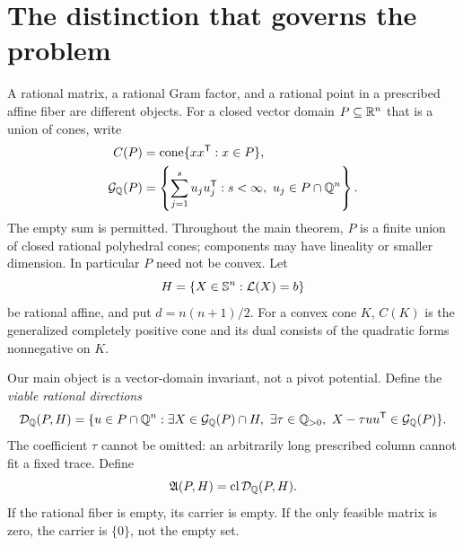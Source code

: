\section{The distinction that governs the problem}
A rational matrix, a rational Gram factor, and a rational point in a prescribed affine fiber are different objects. For a closed vector domain $P\subseteq\mathbb R^n$ that is a union of cones, write
\begin{align}
 C(P)&=\operatorname{cone}\{xx^{\mathsf T}:x\in P\},\\
 \mathcal G_{\mathbb Q}(P)&=\left\{\sum_{j=1}^s u_ju_j^{\mathsf T}:s<\infty,\ u_j\in P\cap\mathbb Q^n\right\}.
\end{align}
The empty sum is permitted. Throughout the main theorem, $P$ is a finite union of closed rational polyhedral cones; components may have lineality or smaller dimension. In particular $P$ need not be convex. Let
\begin{equation}\label{eq:fiber}
 H=\{X\in\mathbb S^n:\mathcal L(X)=b\}
\end{equation}
be rational affine, and put $d=n(n+1)/2$. For a convex cone $K$, $C(K)$ is the generalized completely positive cone and its dual consists of the quadratic forms nonnegative on $K$.

Our main object is a vector-domain invariant, not a pivot potential. Define the \emph{viable rational directions}
\begin{equation}\label{eq:viable}
 \mathcal D_{\Q}(P,H)=\{u\in P\cap\Q^n:\exists X\in\GG(P)\cap H,\ \exists\tau\in\Q_{>0},\ X-\tau uu\trans\in\GG(P)\}.
\end{equation}
The coefficient $\tau$ cannot be omitted: an arbitrarily long prescribed column cannot fit a fixed trace. Define
\begin{equation}\label{eq:carrierdef}
 \mathfrak A(P,H)=\operatorname{cl}\mathcal D_{\mathbb Q}(P,H).
\end{equation}
If the rational fiber is empty, its carrier is empty. If the only feasible matrix is zero, the carrier is $\{0\}$, not the empty set.

